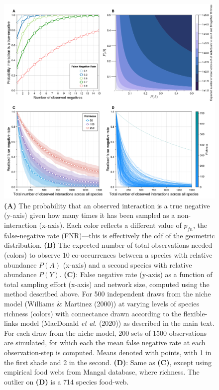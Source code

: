 \documentclass[10pt,oneside]{article}
\makeatletter
\def\maxwidth{\ifdim\Gin@nat@width>\linewidth\linewidth
\else\Gin@nat@width\fi}
\let\Oldincludegraphics\includegraphics
\renewcommand{\includegraphics}[1]{\Oldincludegraphics[width=\maxwidth]{#1}}
\makeatother
\begin{document}
\begin{figure}
\hypertarget{fig:geometric}{%
\centering
\includegraphics{./figures/fig1.png}
\caption{\textbf{(A)} The probability that an observed interaction is a
true negative (y-axis) given how many times it has been sampled as a
non-interaction (x-axis). Each color reflects a different value of
\(p_{fn}\), the false-negative rate (FNR)---this is effectively the cdf
of the geometric distribution. \textbf{(B)} The expected number of total
observations needed (colors) to observe 10 co-occurrences between a
species with relative abundance \(P(A)\) (x-axis) and a second species
with relative abundance \(P(Y)\). \textbf{(C)}: False negative rate
(y-axis) as a function of total sampling effort (x-axis) and network
size, computed using the method described above. For 500 independent
draws from the niche model (Williams \& Martinez (2000)) at varying
levels of species richness (colors) with connectance drawn according to
the flexible-links model (MacDonald \emph{et al.} (2020)) as described
in the main text. For each draw from the niche model, 200 sets of 1500
observations are simulated, for which each the mean false negative rate
at each observation-step is computed. Means denoted with points, with 1
in the first shade and 2 in the second. \textbf{(D)}: Same as
\textbf{(C)}, except using empirical food webs from Mangal database,
where richness. The outlier on \textbf{(D)} is a 714 species
food-web.}\label{fig:geometric}
}
\end{figure}
\end{document}
